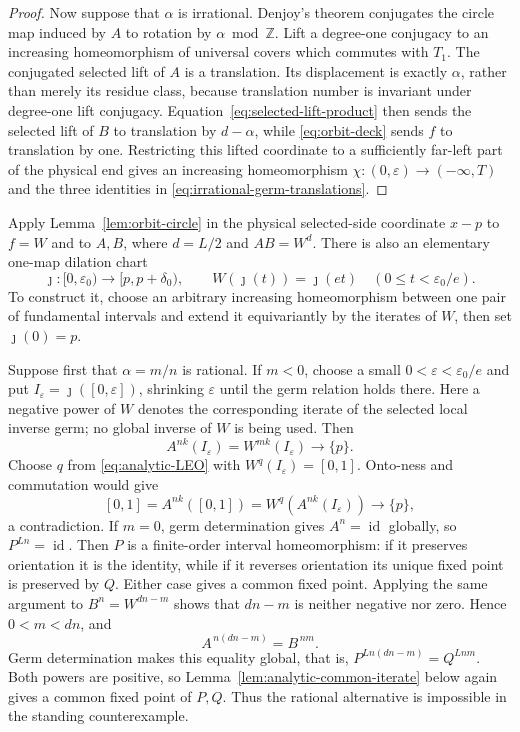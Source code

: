 \documentclass[11pt]{article}
\theoremstyle{definition}
\theoremstyle{remark}
\newcommand{\I}{[0,1]}
\newcommand{\id}{\operatorname{id}}
\begin{document}
\begin{proof}
Now suppose that $\alpha$ is irrational.  Denjoy's theorem conjugates the
circle map induced by $A$ to rotation by $\alpha\bmod\mathbb Z$.  Lift a
degree-one conjugacy to an increasing homeomorphism of universal covers
which commutes with $T_1$.  The conjugated selected lift of $A$ is a
translation.  Its displacement is exactly $\alpha$, rather than merely its
residue class, because translation number is invariant under degree-one lift
conjugacy.  Equation~\eqref{eq:selected-lift-product} then sends the selected
lift of $B$ to translation by $d-\alpha$, while
\eqref{eq:orbit-deck} sends $f$ to translation by one.  Restricting this
lifted coordinate to a sufficiently far-left part of the physical end gives
an increasing homeomorphism
$\chi:(0,\varepsilon)\to(-\infty,T)$ and the three identities in
\eqref{eq:irrational-germ-translations}.
\end{proof}

Apply Lemma~\ref{lem:orbit-circle} in the physical selected-side coordinate
\(x-p\) to \(f=W\) and to \(A,B\), where \(d=L/2\) and \(AB=W^d\).
There is also an elementary one-map dilation chart
\[
 \jmath:[0,\varepsilon_0)\longrightarrow[p,p+\delta_0),\qquad
 W(\jmath(t))=\jmath(et)\quad(0\leq t<\varepsilon_0/e).
\]
To construct it, choose an arbitrary increasing homeomorphism between one
pair of fundamental intervals and extend it equivariantly by the iterates of
\(W\), then set \(\jmath(0)=p\).

Suppose first that \(\alpha=m/n\) is rational.  If \(m<0\), choose a small
\(0<\varepsilon<\varepsilon_0/e\) and put
\(I_\varepsilon=\jmath([0,\varepsilon])\), shrinking \(\varepsilon\) until
the germ relation holds there.
Here a negative power of \(W\) denotes the corresponding iterate of the
selected local inverse germ; no global inverse of \(W\) is being used.
Then
\[
 A^{nk}(I_\varepsilon)=W^{mk}(I_\varepsilon)\longrightarrow\{p\}.
\]
Choose \(q\) from \eqref{eq:analytic-LEO} with
\(W^q(I_\varepsilon)=\I\).  Onto-ness and commutation would give
\[
 \I=A^{nk}(\I)=W^q(A^{nk}(I_\varepsilon))\longrightarrow\{p\},
\]
a contradiction.  If \(m=0\), germ determination gives \(A^n=\id\)
globally, so \(P^{Ln}=\id\).  Then \(P\) is a finite-order interval
homeomorphism: if it preserves orientation it is the identity, while if it
reverses orientation its unique fixed point is preserved by \(Q\).  Either
case gives a common fixed point.  Applying the same argument to
\(B^n=W^{dn-m}\) shows that \(dn-m\) is neither negative nor zero.  Hence
\(0<m<dn\), and
\[
 A^{\,n(dn-m)}=B^{\,nm}.
\]
Germ determination makes this equality global, that is,
\(P^{Ln(dn-m)}=Q^{Lnm}\).  Both powers are positive, so
Lemma~\ref{lem:analytic-common-iterate} below again gives a common fixed
point of \(P,Q\).  Thus the rational alternative is impossible in the
standing counterexample.
\end{document}

